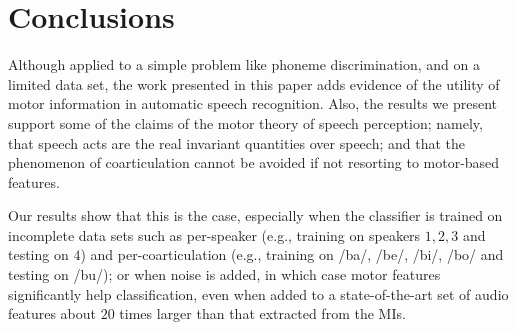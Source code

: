 \section{Conclusions}
\label{sec:concl}

Although applied to a simple problem like phoneme discrimination, and on a
limited data set, the work presented in this paper adds evidence of the utility 
of motor information in automatic speech recognition. Also,
the results we present support some of the claims of the motor theory
of speech perception; namely, that speech acts are the real invariant
quantities over speech; and that the phenomenon of coarticulation cannot
be avoided if not resorting to motor-based features.













 Our results show that
this is the case,
especially when the classifier is trained on incomplete data sets such as 
per-speaker (e.g., training on speakers $1,2,3$ and testing on $4$) and
per-coarticulation (e.g., training on /ba/, /be/, /bi/, /bo/ and testing on /bu/); or when noise is added,
in which case motor features significantly help classification, even when added to a
state-of-the-art set of audio features about $20$ times larger than that extracted
from the MIs.